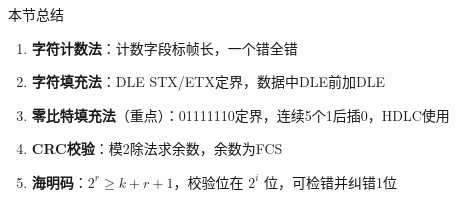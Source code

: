 \documentclass[10pt, aspectratio=169]{beamer}
\begin{document}
\begin{frame}{本节总结}
    \begin{enumerate}
        \item \textbf{字符计数法}：计数字段标帧长，一个错全错
        \item \textbf{字符填充法}：DLE STX/ETX定界，数据中DLE前加DLE
        \item \textbf{零比特填充法}（重点）：01111110定界，连续5个1后插0，HDLC使用
        \item \textbf{CRC校验}：模2除法求余数，余数为FCS
        \item \textbf{海明码}：$2^r \ge k+r+1$，校验位在 $2^i$ 位，可检错并纠错1位
    \end{enumerate}
\end{frame}
\end{document}
